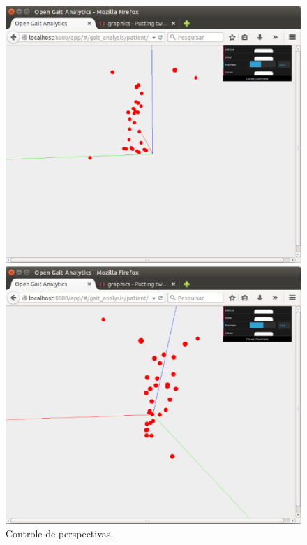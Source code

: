 \begin{figure}[ht]
  \centering
  \begin{minipage}[b]{0.49\textwidth}
    \includegraphics[width=\textwidth]{figuras/tela11.eps}
  \end{minipage}
  \hfill
  \begin{minipage}[b]{0.49\textwidth}
    \includegraphics[width=\textwidth]{figuras/tela12.eps}
  \end{minipage}
  \caption{Controle de perspectivas.}
  \label{animacao2}
\end{figure}

